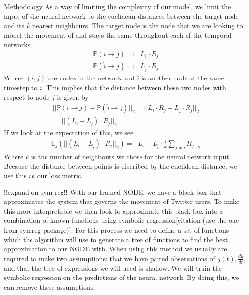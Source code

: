 \documentclass{article}
\begin{document}
\begin{section}{Methodology}
    As a way of limiting the complexity of our model, we limit the input of the neural network to the euclidean distances between the target node and its $k$ nearest neighbours. The target node is the node that we are looking to model the movement of and stays the same throughout each of the temporal networks. 
    \begin{equation}
        \begin{aligned}
            \mathbb{P}(i\rightarrow j)&\coloneqq L_i \cdot R_j\\
            \mathbb{P}(\hat{i}\rightarrow j)&\coloneqq L_{\hat{i}} \cdot R_j
        \end{aligned}
    \end{equation}
    Where $(i,j)$ are nodes in the network and $\hat{i}$ is another node at the same timestep to $i$. This implies that the distance between these two nodes with respect to node $j$ is given by
    \begin{equation}
        \begin{gathered}
            ||\mathbb{P}(i\rightarrow j)-\mathbb{P}(\hat{i}\rightarrow j)||_2 = 
            ||L_i \cdot R_j-L_{\hat{i}} \cdot R_j||_2\\
            =||(L_i -L_{\hat{i}}) \cdot R_j||_2
        \end{gathered}
    \end{equation}
    If we look at the expectation of this, we see
    \begin{equation}
        \begin{gathered}
            \mathbb{E}_j(||(L_i -L_{\hat{i}}) \cdot R_j||_2) = ||L_i -L_{\hat{i}} \cdot \frac{1}{k}\sum_{j\ne i}R_j||_2
        \end{gathered}
    \end{equation}
    Where $k$ is the number of neighbours we chose for the neural network input. Because the distance between points is discribed by the euclidean distance, we use this as our loss metric.

    !!expand on sym reg!! 
    With our trained NODE, we have a black box that approximates the system that governs the movement of Twitter users. To make this more interpretable we then look to approximate this black box into a combination of known functions using symbolic regression[citation (use the one from symreg package)]. For this process we need to define a set of functions which the algorithm will use to generate a tree of functions to find the best approximation to our NODE with. When using this method we usually are required to make two assumptions: that we have paired observations of $y(t), \frac{dy}{dt}$, and that the tree of expressions we will need is shallow. We will train the symbolic regression on the predictions of the neural network. By doing this, we can remove these assumptions\cite{kidger2022neural}.
\end{section}
\end{document}
